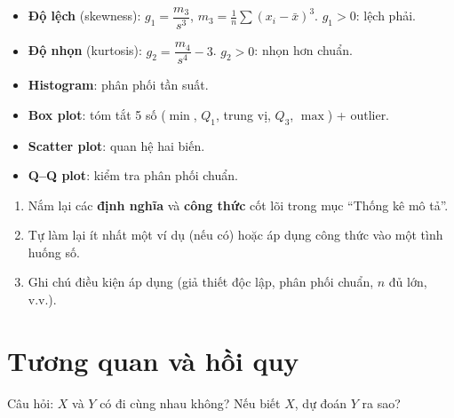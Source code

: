 \documentclass[12pt,a4paper]{article}
\begin{document}
\begin{dinhnghia}[title={Hình dạng phân phối}]
  \begin{itemize}
    \item \textbf{Độ lệch} (skewness): $g_1 = \dfrac{m_3}{s^3}$, $m_3 = \frac{1}{n}\sum(x_i-\bar{x})^3$. $g_1 > 0$: lệch phải.
    \item \textbf{Độ nhọn} (kurtosis): $g_2 = \dfrac{m_4}{s^4} - 3$. $g_2 > 0$: nhọn hơn chuẩn.
  \end{itemize}
\end{dinhnghia}

\begin{phuongphap}[title={Biểu đồ}]
  \begin{itemize}
    \item \textbf{Histogram}: phân phối tần suất.
    \item \textbf{Box plot}: tóm tắt 5 số ($\min$, $Q_1$, trung vị, $Q_3$, $\max$) + outlier.
    \item \textbf{Scatter plot}: quan hệ hai biến.
    \item \textbf{Q--Q plot}: kiểm tra phân phối chuẩn.
  \end{itemize}
\end{phuongphap}


\begin{tongket}[title={Tổng kết: Thống kê mô tả}]
\begin{enumerate}
  \item Nắm lại các \textbf{định nghĩa} và \textbf{công thức} cốt lõi trong mục ``Thống kê mô tả''.
  \item Tự làm lại ít nhất một ví dụ (nếu có) hoặc áp dụng công thức vào một tình huống số.
  \item Ghi chú điều kiện áp dụng (giả thiết độc lập, phân phối chuẩn, $n$ đủ lớn, v.v.).
\end{enumerate}
\end{tongket}

\section{Tương quan và hồi quy}

\begin{dongco}[title={Động cơ --- Tương quan và hồi quy}]
Câu hỏi: $X$ và $Y$ có đi cùng nhau không? Nếu biết $X$, dự đoán $Y$ ra sao?
\end{dongco}
\end{document}
